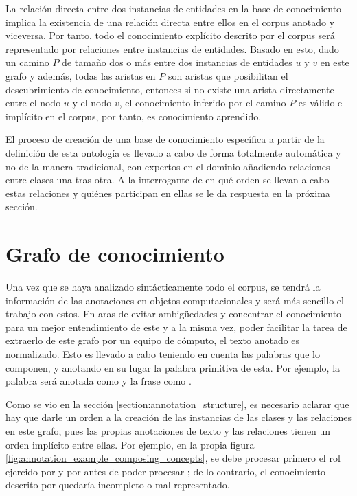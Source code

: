La relación directa entre dos instancias de entidades en la base de conocimiento implica la existencia de una relación directa entre ellos en el corpus anotado y viceversa. Por tanto, todo el conocimiento explícito descrito por el corpus será representado por relaciones entre instancias de entidades. Basado en esto, dado un camino $P$ de tamaño dos o más entre dos instancias de entidades $u$ y $v$ en este grafo y además, todas las aristas en $P$ son aristas que posibilitan el descubrimiento de conocimiento, entonces si no existe una arista directamente entre el nodo $u$ y el nodo $v$, el conocimiento inferido por el camino $P$ es válido e implícito en el corpus, por tanto, es conocimiento aprendido.

El proceso de creación de una base de conocimiento específica a partir de la definición de esta ontología es llevado a cabo de forma totalmente automática y no de la manera tradicional, con expertos en el dominio añadiendo relaciones entre clases una tras otra. A la interrogante de en qué orden se llevan a cabo estas relaciones y quiénes participan en ellas se le da respuesta en la próxima sección.

\section{Grafo de conocimiento}
\vspace{-0.1in}
Una vez que se haya analizado sintácticamente todo el corpus, se tendrá la información de las anotaciones en objetos computacionales y será más sencillo el trabajo con estos. En aras de evitar ambigüedades y concentrar el conocimiento para un mejor entendimiento de este y a la misma vez, poder facilitar la tarea de extraerlo de este grafo por un equipo de cómputo, el texto anotado es normalizado. Esto es llevado a cabo teniendo en cuenta las palabras que lo componen, y anotando en su lugar la palabra primitiva de esta. Por ejemplo, la palabra  será anotada como  y la frase  como .

Como se vio en la sección \ref{section:annotation_structure}, es necesario aclarar que hay que darle un orden a la creación de las instancias de las clases y las relaciones en este grafo, pues las propias anotaciones de texto y las relaciones tienen un orden implícito entre ellas. Por ejemplo, en la propia figura \ref{fig:annotation_example_composing_concepts}, se debe procesar primero el rol ejercido por  y por  antes de poder procesar ; de lo contrario, el conocimiento descrito por  quedaría incompleto o mal representado.

